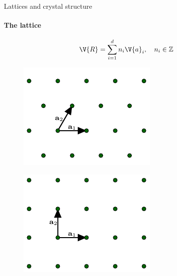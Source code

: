 \documentclass{beamer}
\begin{document}
\begin{frame}{Lattices and crystal structure}
\framesubtitle{The lattice}
\pause
\begin{equation*}
\V{R} = \sum_{i = 1}^{d} n_i \V{a}_i, \quad n_i \in \mathbb{Z}
\end{equation*}
\begin{figure}[H]
	\centering
	\begin{minipage}{.4\textwidth}
		\centering
		\includegraphics[width=\linewidth]{figures/triangular.pdf}
		\label{fig:triangular_lattice}
	\end{minipage}%
	\hfill
	\begin{minipage}{.4\textwidth}
		\centering
		\includegraphics[width=\linewidth]{figures/square.pdf}
		\label{fig:square_lattice}
	\end{minipage}
\end{figure}
\end{frame}
\end{document}
